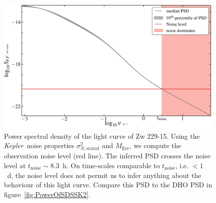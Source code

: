 \documentclass[a4paper,fleqn,usenatbib]{mnras}
\newcommand{\Kepler}{\textit{Kepler~}}
\begin{document}
\begin{figure}
    \includegraphics[width=\textwidth]{images/Zw229-15_PSD.jpg}
    \caption{Power spectral density of the light curve of Zw 229-15. Using the \Kepler noise properties $\sigma^{2}_{N,\mathrm{stated}}$ and $M_{\mathrm{Err}}$, we compute the observation noise level (red line). The inferred PSD crosses the noise level at $t_{\mathrm{noise}} \sim 8.3$~h. On time-scales comparable to $t_{\mathrm{noise}}$, i.e. $< 1$~d, the noise level does not permit us to infer anything about the behaviour of this light curve. Compare this PSD to the DHO PSD in figure~\ref{fig:PowerOfSDSSK2}.}
    \label{fig:Zw229-15_PSD}
\end{figure}
\end{document}
